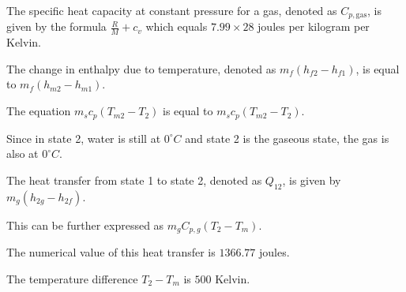 The specific heat capacity at constant pressure for a gas, denoted as \( C_{p, \text{gas}} \), is given by the formula \( \frac{R}{M} + c_v \) which equals \( 7.99 \times 28 \) joules per kilogram per Kelvin.

The change in enthalpy due to temperature, denoted as \( m_f (h_{f2} - h_{f1}) \), is equal to \( m_f (h_{m2} - h_{m1}) \).

The equation \( m_s c_p (T_{m2} - T_2) \) is equal to \( m_s c_p (T_{m2} - T_2) \).

Since in state 2, water is still at \( 0^\circ C \) and state 2 is the gaseous state, the gas is also at \( 0^\circ C \).

The heat transfer from state 1 to state 2, denoted as \( Q_{12} \), is given by \( m_g (h_{2g} - h_{2f}) \).

This can be further expressed as \( m_g C_{p,g} (T_2 - T_m) \).

The numerical value of this heat transfer is \( 1366.77 \) joules.

The temperature difference \( T_2 - T_m \) is \( 500 \) Kelvin.